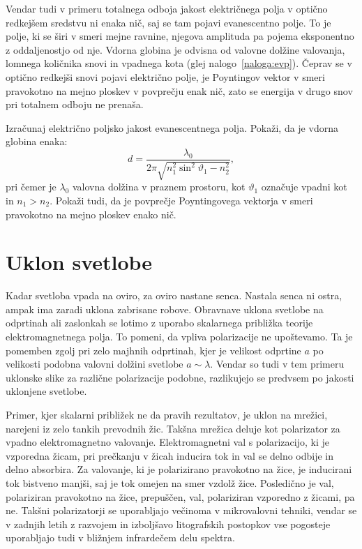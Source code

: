 Vendar tudi v primeru totalnega odboja jakost električnega 
polja v optično redkejšem sredstvu
ni enaka nič, saj se tam pojavi evanescentno polje.
To je polje, ki se širi v smeri mejne ravnine, njegova amplituda pa pojema 
eksponentno z oddaljenostjo od nje. Vdorna globina je odvisna od valovne 
dolžine valovanja, lomnega količnika snovi in vpadnega kota (glej 
nalogo~\ref{naloga:evp}). 
Čeprav se v optično redkejši snovi pojavi električno polje, je Poyntingov
vektor v smeri pravokotno na mejno ploskev v povprečju enak nič, zato se energija
v drugo snov pri totalnem odboju ne prenaša.
\begin{naloga}
\label{naloga:evp}
Izračunaj električno poljsko jakost evanescentnega polja. Pokaži, da
je vdorna globina enaka:
\begin{equation}
d = \frac{\lambda_0}{2 \pi\sqrt{n_1^2 \sin^2 \vartheta_1 - n_2^2}},
\end{equation}
pri čemer je $\lambda_0$ valovna dolžina v praznem prostoru, 
kot $\vartheta_1$ označuje vpadni kot in $n_1>n_2$.
Pokaži tudi, da je povprečje Poyntingovega vektorja v smeri pravokotno na mejno 
ploskev enako nič. 
\end{naloga}

\section{Uklon svetlobe}
Kadar svetloba vpada na oviro, za oviro nastane senca. Nastala senca ni ostra, ampak
ima zaradi uklona zabrisane robove. Obravnave 
uklona svetlobe na odprtinah ali zaslonkah se lotimo z uporabo
skalarnega približka teorije elektromagnetnega polja. To pomeni, da vpliva 
polarizacije ne upoštevamo. Ta je pomemben zgolj pri zelo majhnih odprtinah, 
kjer je velikost odprtine $a$ po velikosti podobna valovni dolžini svetlobe $a \sim \lambda$. 
Vendar so tudi v tem primeru uklonske slike za različne polarizacije podobne, 
razlikujejo se predvsem po jakosti uklonjene svetlobe.
\begin{remark}
Primer, kjer skalarni približek ne da pravih rezultatov, je uklon na mrežici, narejeni 
iz zelo tankih prevodnih žic. Takšna mrežica deluje kot polarizator za vpadno elektromagnetno valovanje.
Elektromagnetni val s polarizacijo, ki je vzporedna žicam, 
pri prečkanju v žicah inducira tok
in val se delno odbije in delno absorbira. Za valovanje, ki je polarizirano pravokotno 
na žice, je  inducirani tok bistveno manjši, saj je tok omejen na smer
vzdolž žice. Posledično je val, polariziran pravokotno na žice, prepuščen, 
val, polariziran vzporedno z žicami, pa ne. 
Takšni polarizatorji se uporabljajo večinoma v mikrovalovni tehniki, 
vendar se v zadnjih letih z razvojem in izboljšavo litografskih postopkov
vse pogosteje uporabljajo tudi v bližnjem infrardečem delu spektra.
\end{remark}

